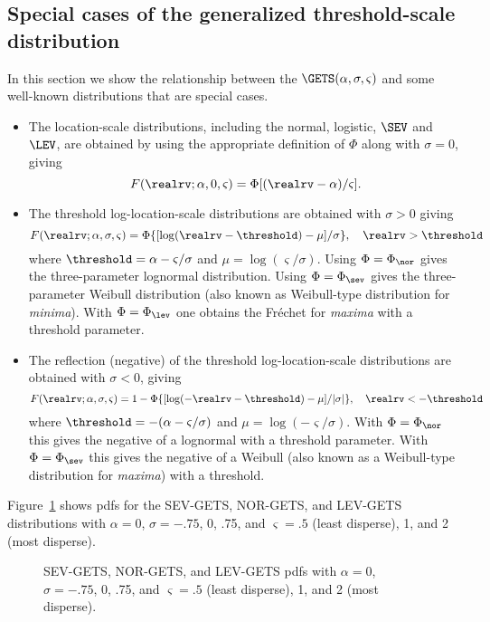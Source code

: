 \subsection{Special cases of the generalized threshold-scale 
distribution}
\label{section:gets.special.cases}
In this section we show the relationship between the 
$\GETS(\alpha, \sigma,\varsigma)$
and some well-known distributions that are special cases.
\begin{itemize}
\item
The location-scale
distributions, including the normal, logistic,
$\SEV$ and $\LEV$, are obtained by using the
appropriate definition of $\Phi$ along with $\sigma=0$, giving
\begin{displaymath}
F(\realrv; \alpha, 0,\varsigma)=\Phi[(\realrv-\alpha)/\varsigma].
\end{displaymath}
\item
The threshold log-location-scale
distributions are obtained with
$\sigma>0$ giving
\begin{displaymath}
F(\realrv;\alpha, \sigma,\varsigma)=
\Phi\{[\log(\realrv-\threshold)-\mu]/\sigma\},
\quad \realrv>\threshold
\end{displaymath}
where $\threshold=\alpha-\varsigma/\sigma$ and
$\mu=\log(\varsigma/\sigma)$.
Using $\Phi=\Phi_{\nor}$ gives the three-parameter lognormal distribution.
Using $\Phi=\Phi_{\sev}$ gives the three-parameter Weibull 
distribution (also known
as Weibull-type distribution for {\em minima}).
With $\Phi=\Phi_{\lev}$ one obtains the Fr\'echet for 
{\em maxima} with a threshold parameter.
\item
The reflection (negative) of the threshold
log-location-scale distributions are obtained with $\sigma<0$,
giving
\begin{displaymath}
F(\realrv;\alpha, \sigma,\varsigma)=
1 - \Phi\{[\log(-\realrv-\threshold)-\mu]/ |\sigma| \},
\quad \realrv<-\threshold
\end{displaymath}
where $\threshold=-(\alpha-\varsigma/\sigma)$ and
$\mu=\log(-\varsigma/\sigma)$.  With $\Phi=\Phi_{\nor}$ this gives the
negative of a lognormal with a threshold parameter.  With
$\Phi=\Phi_{\sev}$ this gives the negative of a Weibull (also known as
a Weibull-type distribution for {\em maxima}) with a threshold.
\end{itemize}
Figure~\ref{figure:gets.pddf.ps} shows pdfs for the SEV-GETS,
NOR-GETS, and LEV-GETS distributions with $\alpha=0$,
$\sigma=-.75$, 0, .75, and $\varsigma = .5$ (least
disperse), 1, and 2 (most disperse).
\begin{figure}
\caption{SEV-GETS, NOR-GETS, and LEV-GETS pdfs with $\alpha=0$,
$\sigma= -.75$, 0, .75, and $\varsigma = .5$ (least disperse), 1, and
2 (most disperse).}
\label{figure:gets.pddf.ps}
\end{figure}


